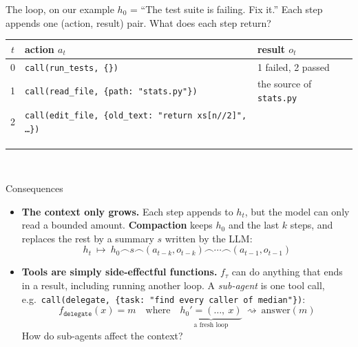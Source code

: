 \documentclass[aspectratio=169,14pt]{beamer}
\newcommand{\frownop}{\mathbin{\frown}}
\newcommand{\redact}[2]{\alt<#1>{#2}{\leavevmode{\sethlcolor{redactc}\color{redactc}\hl{#2}}}}
\begin{document}
\begin{frame}{The loop, on our example}
  \small
  $h_0$ = ``The test suite is failing. Fix it.'' Each step appends one (action, result) pair. What does each step return?\\[4pt]
  \footnotesize
  \setlength{\tabcolsep}{4pt}\begin{tabular}{@{}c l l@{}}
    $t$ & \textcolor{actc}{action $a_t$} & \textcolor{obsc}{result $o_t$} \\ \hline
    \rule{0pt}{11pt}0 & \texttt{call(run\_tests, \{\})} & 1 failed, 2 passed \\[2pt]
    1 & \texttt{call(read\_file, \{path: "stats.py"\})} & the source of \texttt{stats.py} \\[2pt]
    2 & \texttt{call(edit\_file, \{old\_text: "return xs[n//2]", \ldots\})} & \textcolor{hilc}{\redact{2-}{error: old\_text not found}} \\[2pt]
    \visible<3->{3} & \visible<3->{\texttt{call(edit\_file, \{old\_text: "return xs[n // 2]", \ldots\})}} & \visible<3->{ok} \\[2pt]
    \visible<3->{4} & \visible<3->{\texttt{call(run\_tests, \{\})}} & \visible<3->{3 passed} \\[2pt]
    \visible<3->{5} & \visible<3->{\texttt{answer("Fixed median; 3 tests pass.")}} & \visible<3->{\redact{4-}{(loop stops)}} \\
  \end{tabular}\\[4pt]
\end{frame}

\begin{frame}{Consequences}
  \small
  \begin{itemize}\setlength{\itemsep}{10pt}
    \item<1-> \textbf{The context only grows.} Each step appends to $h_t$, but the model can only read a bounded amount. \textbf{Compaction} keeps $h_0$ and the last $k$ steps, and replaces the rest by a summary $s$ written by the LLM:
    \[
      h_t \ \longmapsto\ h_0 \frownop s \frownop (a_{t-k}, o_{t-k}) \frownop \cdots \frownop (a_{t-1}, o_{t-1})
    \]
    \item<2-> \textbf{Tools are simply side-effectful functions.} $f_\tau$ can do anything that ends in a result, including running another loop. A \emph{sub-agent} is one tool call, e.g.\ \texttt{call(delegate, \{task: "find every caller of median"\})}:
    \[
      f_{\texttt{delegate}}(x) = m \quad \text{where} \quad \underbrace{h_0' = (\ldots,\ x)}_{\text{a fresh loop}} \ \rightsquigarrow\ \text{answer}(m)
    \]
    {\color{greyc} How do sub-agents affect the context?}
  \end{itemize}
\end{frame}
\end{document}

